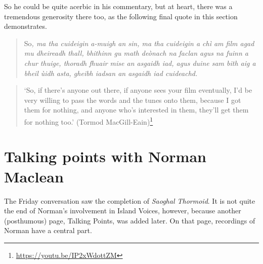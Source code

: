 \documentclass[output=paper,colorlinks,citecolor=brown]{langscibook}
\begin{document}

So he could be quite acerbic in his commentary, but at heart, there was a tremendous generosity there too, as the following final quote in this section demonstrates. 

\begin{quote}
So\textit{, ma tha cuideigin a-muigh an sin, ma tha cuideigin a chì am film agad mu dheireadh thall, bhithinn gu math deònach na faclan agus na fuinn a chur thuige, thoradh fhuair mise an asgaidh iad, agus duine sam bith aig a bheil ùidh asta, gheibh iadsan an asgaidh iad cuideachd.} 
\end{quote}

\begin{quote}
`So, if there’s anyone out there, if anyone sees your film eventually, I’d be very willing to pass the words and the tunes onto them, because I got them for nothing, and anyone who’s interested in them, they’ll get them for nothing too.' (Tormod MacGill-Eain)\footnote{\url{https://youtu.be/IP2xWdottZM}}
\end{quote}



\section{Talking points with Norman Maclean}


The Friday conversation saw the completion of \textit{Saoghal Thormoid}. It is not quite the end of Norman’s involvement in Island Voices, however, because another (posthumous) page, Talking Points, was added later. On that page, recordings of Norman have a central part. 
\end{document}
